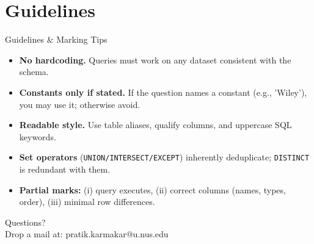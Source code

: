 \documentclass{beamer}
\begin{document}
\section{Guidelines}
\begin{frame}{Guidelines \& Marking Tips}
\small
\begin{itemize}\itemsep4pt
  \item \textbf{No hardcoding.} Queries must work on any dataset consistent with the schema.
  \item \textbf{Constants only if stated.} If the question names a constant (e.g., 'Wiley'), you may use it; otherwise avoid.
  \item \textbf{Readable style.} Use table aliases, qualify columns, and uppercase SQL keywords.
  \item \textbf{Set operators} (\texttt{UNION/INTERSECT/EXCEPT}) inherently deduplicate; \texttt{DISTINCT} is redundant with them.
  \item \textbf{Partial marks:} (i) query executes, (ii) correct columns (names, types, order), (iii) minimal row differences.
\end{itemize}
\end{frame}

\begin{frame}
\begin{center}
Questions?\\
Drop a mail at: pratik.karmakar@u.nus.edu
\end{center}
\end{frame}
\end{document}
